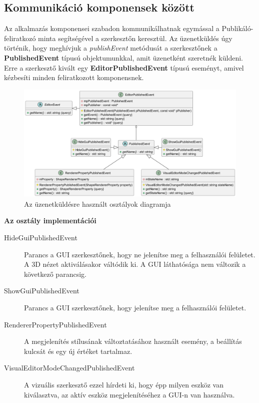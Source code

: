 \subsection{Kommunikáció komponensek között}

Az alkalmazás komponensei szabadon kommunikálhatnak egymással a Publikáló-feliratkozó minta segítségével a szerkesztőn keresztül. Az üzenetküldés úgy történik, hogy meghívjuk a \textit{publishEvent} metódusát a szerkesztőnek a \textbf{PublishedEvent} típusú objektumunkkal, amit üzenetként szeretnék küldeni. Erre a szerkesztő kivált egy \textbf{EditorPublishedEvent} típusú eseményt, amivel kézbesíti minden feliratkozott komponensnek.

\begin{figure}[H]
    \centering
    \includegraphics[width=1\linewidth]{images/class_editor_published_event.png}
    \caption{Az üzenetküldésre használt osztályok diagramja}
    \label{fig:class_editor_published_event-1}
\end{figure}

\textbf{Az osztály implementációi}

\begin{description}
    \item[HideGuiPublishedEvent] Parancs a GUI szerkesztőnek, hogy ne jelenítse meg a felhasználói felületet. A 3D nézet aktiválásakor váltódik ki. A GUI láthatósága nem változik a következő parancsig.
    \item[ShowGuiPublishedEvent] Parancs a GUI szerkesztőnek, hogy jelenítse meg a felhasználói felületet.
    \item[RendererPropertyPublishedEvent] A megjelenítés stílusának változtatásához használt esemény, a beállítás kulcsát és egy új értéket tartalmaz.
    \item[VisualEditorModeChangedPublishedEvent] A vizuális szerkesztő ezzel hírdeti ki, hogy épp milyen eszköz van kiválasztva, az aktív eszköz megjelenítéséhez a GUI-n van használva.
\end{description}

